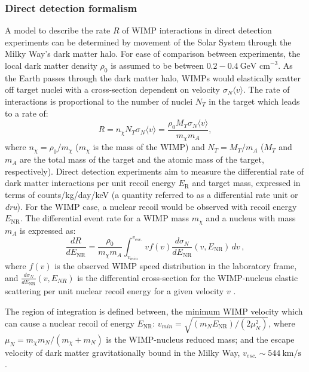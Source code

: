 \subsubsection{Direct detection formalism}\label{sec:DMOverview/DDFormalism}
A model to describe the rate $R$ of WIMP interactions in direct detection experiments can be determined by movement of the Solar System through the Milky Way's dark matter halo. For ease of comparison between experiments, the local dark matter density $\rho_0$ is assumed to be between $0.2-0.4~\text{GeV cm}^{-3}$\cite{Green:2011bv}. As the Earth passes through the dark matter halo, WIMPs would elastically scatter off target nuclei with a cross-section dependent on velocity $\sigma_N\langle v\rangle$. The rate of interactions is proportional to the number of nuclei $N_T$ in the target which leads to a rate of:
\begin{equation}
    R=n_\chi N_T\sigma_N\langle v\rangle=\frac{\rho_0M_T\sigma_N\langle v\rangle}{m_\chi m_A},
\end{equation}
where $n_\chi=\rho_0/m_\chi$ ($m_\chi$ is the mass of the WIMP) and $N_T=M_T/m_A$ ($M_T$ and $m_A$ are the total mass of the target and the atomic mass of the target, respectively). Direct detection experiments aim to measure the differential rate of dark matter interactions per unit recoil energy $E_\text{R}$ and target mass, expressed in terms of counts/kg/day/keV (a quantity referred to as a differential rate unit or \textit{dru})\cite{Cerdeno:2010jj}. 
For the WIMP case, a nuclear recoil would be observed with recoil energy $E_\text{NR}$. The differential event rate for a WIMP mass $m_\chi$ and a nucleus with mass $m_A$ is expressed as:
\begin{equation}
  \frac{dR}{dE_\text{NR}}=\frac{\rho_0}{m_\chi m_A}\int_{v_{min}}^{v_{esc.}}  v
  f(v) \frac{d\sigma_N}{dE_\text{NR}}(v,E_\text{NR})\, d v\,,
  \label{eqn:diff_rate}
\end{equation}
where $f(v)$ is the observed WIMP speed distribution in the laboratory frame, and $\frac{d\sigma_N}{dE_\text{NR}}(v,E_{NR})$ is the differential cross-section for the WIMP-nucleus elastic scattering per unit nuclear recoil energy for a given velocity $v$ \cite{jaalbers:thesis}.

The region of integration is defined between, the minimum WIMP velocity which can cause a nuclear recoil of energy $E_\text{NR}$: $v_{min}=\sqrt{(m_NE_\text{NR})/(2\mu_N^2)}$, where $\mu_N=m_\chi m_N/(m_\chi+m_N)$ is the WIMP-nucleus reduced mass; and the escape velocity of dark matter gravitationally bound in the Milky Way, $v_{esc.}\sim544~\text{km/s}$ \cite{OlcinaSamblas:thesis}. 

